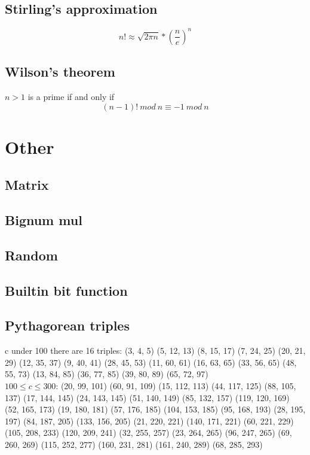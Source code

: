 \documentclass[A4 paper, 12pt, oneside, landscape]{article}
\begin{document}
\begin{multicols}{2}
	\subsection{Stirling's approximation}
	\[n! \approx \sqrt{2\pi n} * (\frac{n}{e}) ^ n\]
	
	\subsection{Wilson's theorem}
	$n > 1$ is a prime if and only if 
	\[ (n - 1)! \ mod \ n \equiv -1 \ mod \ n \]

\section{Other}
    \subsection{Matrix}
    

	\subsection{Bignum mul}
	
	
	\subsection{Random}
	
	
	\subsection{Builtin bit function}
	
	
	\subsection{Pythagorean triples}
	c under 100 there are 16 triples:
	(3, 4, 5)	(5, 12, 13)	(8, 15, 17)	(7, 24, 25)
(20, 21, 29)	(12, 35, 37)	(9, 40, 41)	(28, 45, 53)
(11, 60, 61)	(16, 63, 65)	(33, 56, 65)	(48, 55, 73)
(13, 84, 85)	(36, 77, 85)	(39, 80, 89)	(65, 72, 97) \\

	$100 \leq c \leq 300$:
	(20, 99, 101)	(60, 91, 109)	(15, 112, 113)	(44, 117, 125)
(88, 105, 137)	(17, 144, 145)	(24, 143, 145)	(51, 140, 149)
(85, 132, 157)	(119, 120, 169)	(52, 165, 173)	(19, 180, 181)
(57, 176, 185)	(104, 153, 185)	(95, 168, 193)	(28, 195, 197)
(84, 187, 205)	(133, 156, 205)	(21, 220, 221)	(140, 171, 221)
(60, 221, 229)	(105, 208, 233)	(120, 209, 241)	(32, 255, 257)
(23, 264, 265)	(96, 247, 265)	(69, 260, 269)	(115, 252, 277)
(160, 231, 281)	(161, 240, 289)	(68, 285, 293)


\end{multicols}
\end{document}
